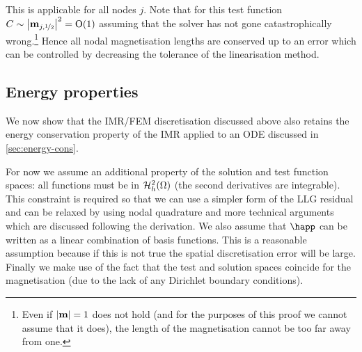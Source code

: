 This is applicable for all nodes $j$.
Note that for this test function $C \sim \left|{\boldsymbol{\mathrm{m}}_{{j},\nicefrac{1}{2}}} \right|^2 = \mathrm{O}{\left( 1 \right)}$ assuming that the solver has not gone catastrophically wrong.\footnote{Even if $\left|{\boldsymbol{\mathrm{m}}} \right|=1$ does not hold (and for the purposes of this proof we cannot assume that it does), the length of the magnetisation cannot be too far away from one.}
Hence all nodal magnetisation lengths are conserved up to an error which can be controlled by decreasing the tolerance of the linearisation method.



\subsection{Energy properties}

\newcommand{\midpoint}[1]{\hat{#1}}
\newsubcommand{\mvm}{\midpoint{\mv}}{n}
\newcommand{\tm}{\midpoint{t}_n}
\newcommand{\dtop}{\delta}
\newcommand{\pdsub}[3]{\mathrlap{\pd{#1\mathrlap{_{#2}}}{#3}}\phantom{\pd{#1_{#2}}{#3}}}
\newcommand{\dmdtm}{\dtop \mv}
\newcommand{\dmdtml}{\dtop \mv_{n,l}}
\newcommand{\dmdtmj}{\dtop \mv_{n,j}}

\newcommand{\ipg}[2]{\intd{{#1} \cdot {#2}}}

\newcommand{\nodal}{\textrm{nodal}}

We now show that the IMR/FEM discretisation discussed above also retains the energy conservation property of the IMR applied to an ODE discussed in \cref{sec:energy-cons}.

For now we assume an additional property of the solution and test function spaces: all functions must be in $\mathcal{H}_h^2(\Omega)$ (\ie the second derivatives are integrable).
This constraint is required so that we can use a simpler form of the LLG residual and can be relaxed by using nodal quadrature and more technical arguments which are discussed following the derivation.
We also assume that $\happ$ can be written as a linear combination of basis functions.
This is a reasonable assumption because if this is not true the spatial discretisation error will be large.
Finally we make use of the fact that the test and solution spaces coincide for the magnetisation (due to the lack of any Dirichlet boundary conditions).

